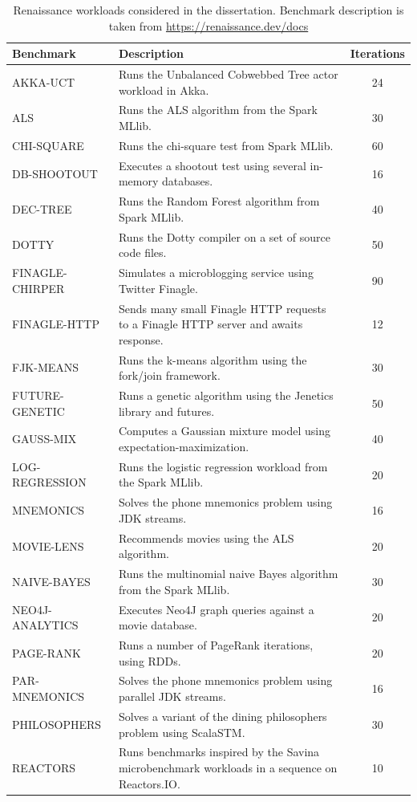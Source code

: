 \documentclass[]{usiinfthesis}
\begin{document}
\begin{table}
\centering
\caption[Renaissance Benchmarks Descriptions]{Renaissance workloads considered in the dissertation. Benchmark description is taken from \url{https://renaissance.dev/docs}}
\label{tab:1}
\begin{tabularx}{\textwidth}{|l|X|c|}
\hline
Benchmark&Description&Iterations\\
\hline
AKKA-UCT&Runs the Unbalanced Cobwebbed Tree actor workload in Akka.&24\\
ALS&Runs the ALS algorithm from the Spark MLlib.&30\\
CHI-SQUARE&Runs the chi-square test from Spark MLlib.&60\\
DB-SHOOTOUT&Executes a shootout test using several in-memory databases.&16\\
DEC-TREE&Runs the Random Forest algorithm from Spark MLlib.&40\\
DOTTY&Runs the Dotty compiler on a set of source code files.&50\\
FINAGLE-CHIRPER&Simulates a microblogging service using Twitter Finagle.&90\\
FINAGLE-HTTP&Sends many small Finagle HTTP requests to a Finagle HTTP server and awaits response.&12\\
FJK-MEANS&Runs the k-means algorithm using the fork/join framework.&30\\
FUTURE-GENETIC&Runs a genetic algorithm using the Jenetics library and futures.&50\\
GAUSS-MIX&Computes a Gaussian mixture model using expectation-maximization.&40\\
LOG-REGRESSION&Runs the logistic regression workload from the Spark MLlib.&20\\
MNEMONICS&Solves the phone mnemonics problem using JDK streams.&16\\
MOVIE-LENS&Recommends movies using the ALS algorithm.&20\\
NAIVE-BAYES&Runs the multinomial naive Bayes algorithm from the Spark MLlib.&30\\
NEO4J-ANALYTICS&Executes Neo4J graph queries against a movie database.&20\\
PAGE-RANK&Runs a number of PageRank iterations, using RDDs.&20\\
PAR-MNEMONICS&Solves the phone mnemonics problem using parallel JDK streams.&16\\
PHILOSOPHERS&Solves a variant of the dining philosophers problem using ScalaSTM.&30\\
REACTORS	&Runs benchmarks inspired by the Savina microbenchmark workloads in a sequence on Reactors.IO.	&10	\\

\end{tabularx}
\end{table}
\end{document}
